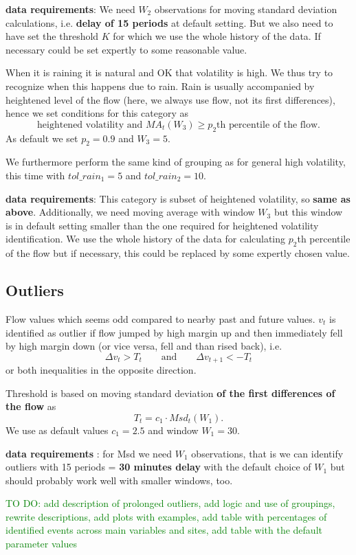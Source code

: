 \documentclass[12pt,a4paper]{article}
\begin{document}
\textbf{data requirements}: We need $W_2$ observations for moving standard deviation calculations, i.e. \textbf{delay of 15 periods} at default setting. But we also need to have set the threshold $K$ for which we use the whole history of the data. If necessary could be set expertly to some reasonable value.


When it is raining it is natural and OK that volatility is high. We thus try to recognize when this happens due to rain. Rain is usually accompanied by heightened level of the flow (here, we always use flow, not its first differences), hence we set conditions for this category as
$$ \text{heightened volatility and }  MA_t(W_3) \geq p_2\text{th percentile of the flow.} $$
As default we set $p_2 = 0.9$ and $W_3 = 5$.

We furthermore perform the same kind of grouping as for general high volatility, this time with $tol\_rain_1 = 5$ and $tol\_rain_2 = 10$.

\textbf{data requirements}: This category is subset of heightened volatility, so \textbf{same as above}. Additionally, we need moving average with window $W_3$ but this window is in default setting smaller than the one required for heightened volatility identification. We use the whole history of the data for calculating $p_2$th percentile of the flow but if necessary, this  could be replaced by some expertly chosen value.


\subsection{Outliers}
Flow values which seems odd compared to nearby past and future values. $v_t$ is identified as outlier if flow jumped by high margin up and then immediately fell by high margin down (or vice versa, fell and than rised back), i.e.
$$ \Delta v_t > T_t \qquad \text{and} \qquad \Delta v_{t+1} < -T_t $$
or both inequalities in the opposite direction.

Threshold is based on moving standard deviation \textbf{of the first differences of the flow } as 
$$ T_t = c_1 \cdot Msd_t(W_1). $$
We use as default values $c_1 = 2.5$ and window $W_1 = 30$.

\textbf{data requirements }: for Msd we need $W_1$ observations, that is we can identify outliers with 15 periods = \textbf{ 30 minutes delay} with the default choice of $W_1$ but should probably work well with smaller windows, too.



\textcolor{green}{TO DO: add description of prolonged outliers, add logic and use of groupings, rewrite descriptions, add plots with examples, add table with percentages of identified events across main variables and sites,  add table with the default parameter values}
\end{document}
